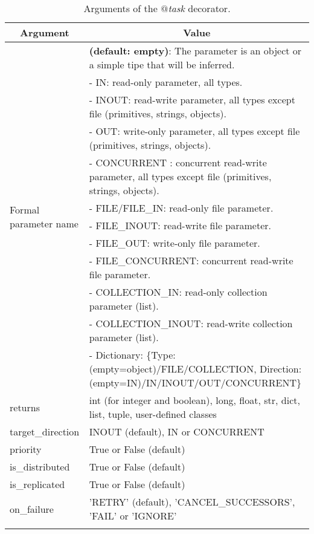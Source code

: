 \bgroup
  \def\arraystretch{1.5}%
  \begin{longtable}{| p{} | p{} |}
    \hline
    \multicolumn{1}{|c|}{{\bf Argument }}    &  \multicolumn{1}{c|}{{\bf Value }}\\
    \hline
    \multirow{12}{*}{Formal parameter name}  &  {\bf (default: empty)}: The parameter is an object or a simple tipe that will be inferred. \\
    & - IN: read-only parameter, all types. \\
    & - INOUT: read-write parameter, all types except file (primitives, strings, objects). \\
    & - OUT: write-only parameter, all types except file (primitives, strings, objects). \\
    & - CONCURRENT : concurrent read-write parameter, all types except file (primitives, strings, objects). \\
    & - FILE/FILE\_IN: read-only file parameter. \\
    & - FILE\_INOUT: read-write file parameter. \\
    & - FILE\_OUT: write-only file parameter. \\
    & - FILE\_CONCURRENT: concurrent read-write file parameter. \\ 
    & - COLLECTION\_IN: read-only collection parameter (list). \\
    & - COLLECTION\_INOUT: read-write collection parameter (list). \\
    & - Dictionary: \{Type:(empty=object)/FILE/COLLECTION, Direction:(empty=IN)/IN/INOUT/OUT/CONCURRENT\} \\
    \hline
    returns & int (for integer and boolean), long, float, str, dict, list, tuple, user-defined classes \\
    \hline
    target\_direction &  INOUT (default), IN or CONCURRENT \\
    \hline
    priority  & True or False (default) \\
    \hline
    is\_distributed & True or False (default) \\
    \hline
    is\_replicated  & True or False (default) \\
    \hline
    on\_failure  & 'RETRY' (default), 'CANCEL\_SUCCESSORS', 'FAIL' or 'IGNORE' \\
    \hline
    \caption{Arguments of the {\it $@$task} decorator.}
    \label{tab:task_decorator_arguments}
  \end{longtable}
\egroup



